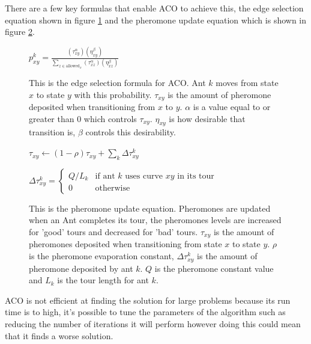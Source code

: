 There are a few key formulas that enable ACO to achieve this, the edge selection equation shown in figure \ref{eq:ACOEdgeselection} and the pheromone update equation which is shown in figure \ref{eq:pheremoneupdate}. 

\begin{figure}[h]
    \centering
    $
    p_{xy}^k =
    \frac
    { (\tau_{xy}^{\alpha}) (\eta_{xy}^{\beta}) }
    { \sum_{z\in \mathrm{allowed}_x} (\tau_{xz}^{\alpha}) (\eta_{xz}^{\beta}) }$
    \caption{This is the edge selection formula for ACO. Ant $k$ moves from state $x$ to state $y$ with this probability. $\tau_{xy}$ is the amount of pheromone deposited when transitioning from $x$ to $y$. $\alpha$ is a value equal to or greater than 0 which controls $\tau_{xy}$. $\eta_{xy}$ is how desirable that transition is, $\beta$ controls this desirability.}
    \label{eq:ACOEdgeselection}
\end{figure}

\begin{figure}[h]
    \centering
    $ \tau_{xy} \leftarrow
    (1-\rho)\tau_{xy} + \sum_{k}\Delta \tau^{k}_{xy}$
    
    $\Delta \tau^{k}_{xy} =
    \begin{cases}
    Q/L_k & \mbox{if ant }k\mbox{ uses curve }xy\mbox{ in its tour} \\
    0 & \mbox{otherwise}
    \end{cases}$
    \caption{This is the pheromone update equation. Pheromones are updated when an Ant completes its tour, the pheromones levels are increased for 'good' tours and decreased for 'bad' tours. $\tau_{xy}$ is the amount of pheromones deposited when transitioning from state $x$ to state $y$. $\rho$ is the pheromone evaporation constant, $\Delta \tau^{k}_{xy}$ is the amount of pheromone deposited by ant $k$. $Q$ is the pheromone constant value and $L_k$ is the tour length for ant $k$.}
    \label{eq:pheremoneupdate}
\end{figure}

ACO is not efficient at finding the solution for large problems because its run time is to high, it's possible to tune the parameters of the algorithm such as reducing the number of iterations it will perform however doing this could mean that it finds a worse solution. 

